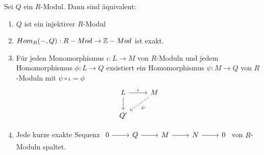 \begin{sa}
	Sei $Q$ ein $R$-Modul. Dann sind äquivalent:
	\begin{enumerate} [label= \roman*)]
		\item $Q$ ist ein injektiver $R$-Modul 
		\item $Hom_{R}(-,Q): R-Mod \to \mathbb{Z}-Mod $ ist exakt.
		\item Für jeden Monomorphismus $\iota: L \to M $ von $R$-Moduln und jedem Homomorphismus $\phi: L \to Q $ exsistiert ein Homomorphismus $\psi: M \to Q $ von $R$-Moduln  mit $ \psi \circ \iota = \phi $
		$$\begin{tikzcd}
		L \arrow{r} {\iota} \arrow{d}& M \arrow[dashed]{dl}{\psi} \\
		Q' &
		\end{tikzcd}
		$$
		\item Jede kurze exakte Sequenz $\begin{tikzcd}
		0  \arrow{r} & Q \arrow{r} & M \arrow{r} & N \arrow{r} & 0
		\end{tikzcd} $ von $R$-Moduln spaltet.
	\end{enumerate}
\end{sa}
